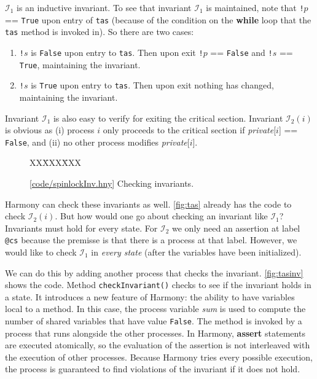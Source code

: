 \documentclass{report}
\newcommand{\harmonysource}[1]{
\begin{tabbing}
XX\=XXX\=XXX\kill
    
\end{tabbing}
}
\newcommand{\harmonylink}[1]{%
[\href{https://www.cs.cornell.edu/home/rvr/harmony/#1}{\underline{#1}}]%
}
\newenvironment{code}{
\tcolorbox
}{
\endtcolorbox
}
\begin{document}
$\mathcal{I}_1$ is an inductive invariant.
To see that invariant $\mathcal{I}_1$ is maintained, note that
\texttt{!}$p$ == \texttt{True} upon entry of \texttt{tas}
(because of the condition on the \textbf{while} loop that the
\texttt{tas} method is invoked in).
So there are two cases:
\begin{enumerate}
\item \texttt{!}$s$ is \texttt{False} upon entry to \texttt{tas}.
Then upon exit \texttt{!}$p$ == \texttt{False} and \texttt{!}$s$ == \texttt{True},
maintaining the invariant.
\item \texttt{!}$s$ is \texttt{True} upon entry to \texttt{tas}.
Then upon exit nothing has changed, maintaining the invariant.
\end{enumerate}
Invariant $\mathcal{I}_1$ is also easy to verify for exiting the critical section.
Invariant $\mathcal{I}_2(i)$ is obvious as (i) process $i$ only proceeds to the critical
section if \textit{private}[$i$] == \texttt{False}, and (ii) no other process modifies
\textit{private}[$i$].

\begin{figure}
\begin{code}
\harmonysource{spinlockInv}
\end{code}
\caption{\harmonylink{code/spinlockInv.hny} Checking invariants.}
\label{fig:tasinv}
\end{figure}

Harmony can check these invariants as well.  \autoref{fig:tas} already
has the code to check $\mathcal{I}_2(i)$.  But how would one go about checking an
invariant like $\mathcal{I}_1$?  Invariants must hold for every state.
For $\mathcal{I}_2$ we only need an assertion at label \texttt{@cs} because the
premisse is that there is a process at that label.  However, we would
like to check $\mathcal{I}_1$ in \emph{every state} (after the variables have
been initialized).

We can do this by adding another process that
checks the invariant.  \autoref{fig:tasinv} shows the code.
Method \texttt{checkInvariant()} checks to see if the invariant holds
in a state.  It introduces a new feature of Harmony: the ability to have
variables local to a method.  In this case, the process variable \textit{sum}
is used to compute the number of shared variables that have value
\texttt{False}.
The method is invoked by a process that runs alongside
the other processes.
In Harmony, \textbf{assert} statements are executed atomically, so the
evaluation of the assertion is not interleaved with the execution
of other processes.
Because Harmony tries every possible execution, the process is guaranteed
to find violations of the invariant if it does not hold.
\end{document}
